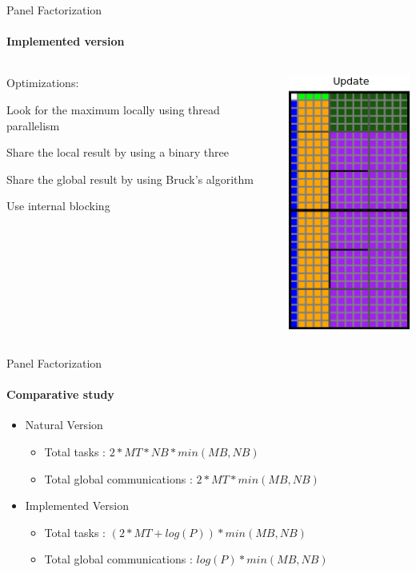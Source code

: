 \documentclass{beamer}
\begin{document}
\begin{frame}{Panel Factorization}
\framesubtitle{Implemented version}
\begin{columns}
\begin{column}{.50\textwidth}
Optimizations:
\begin{itemize}
{
\item Look for the maximum locally using thread parallelism
\item Share the local result by using a binary three
\item Share the global result by using Bruck's algorithm}
\item Use internal blocking
\end{itemize}
\end{column}
\hfill
\begin{column}{.50\textwidth}
\begin{center}
\includegraphics[scale=0.5]{panel_opt2.png}
\end{center}
\end{column}
\end{columns}
\end{frame}

\begin{frame}{Panel Factorization}
\framesubtitle{Comparative study}
\begin{itemize}
\item Natural Version
\begin{exampleblock}{}
\begin{itemize}
\item Total tasks : $2 * MT * NB * min(MB,NB)$
\item Total global communications : $2 * MT * min(MB,NB)$
\end{itemize}
\end{exampleblock}{}
\item Implemented Version
\begin{exampleblock}{}
\begin{itemize}
\item Total tasks : $(2 * MT + log(P)) * min(MB,NB)$
\item Total global communications : $log(P) * min(MB,NB)$
\end{itemize}
\end{exampleblock}{}
\end{itemize}
\end{frame}
\end{document}
